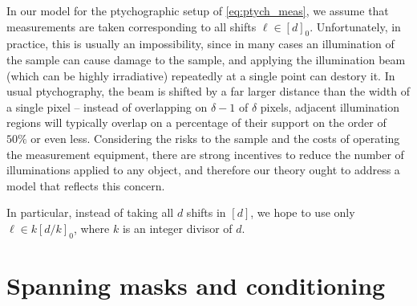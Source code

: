 In our model for the ptychographic setup of \eqref{eq:ptych_meas}, we assume that measurements are taken corresponding to all shifts $\ell \in [d]_0$.  Unfortunately, in practice, this is usually an impossibility, since in many cases an illumination of the sample can cause damage to the sample, and applying the illumination beam (which can be highly irradiative) repeatedly at a single point can destory it.  In usual ptychography, the beam is shifted by a far larger distance than the width of a single pixel -- instead of overlapping on $\delta - 1$ of $\delta$ pixels, adjacent illumination regions will typically overlap on a percentage of their support on the order of $50\%$ or even less.  Considering the risks to the sample and the costs of operating the measurement equipment, there are strong incentives to reduce the number of illuminations applied to any object, and therefore our theory ought to address a model that reflects this concern.

In particular, instead of taking all $d$ shifts in $[d]$, we hope to use only $\ell \in k [d / k]_0$, where $k$ is an integer divisor of $d$.

\section{Spanning masks and conditioning}

\label{sec:con_number_ptych}
